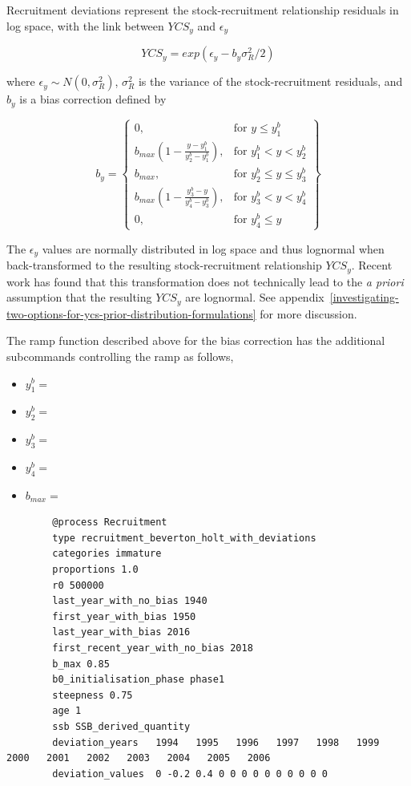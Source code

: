 Recruitment deviations represent the stock-recruitment relationship residuals in log space, with the link between $YCS_y$ and $\epsilon_y$

\begin{equation}\label{eq:recruit_devs}
	YCS_y = exp(\epsilon_y - b_y\sigma^2_R / 2)
\end{equation}

where $\epsilon_y\sim N(0,\sigma^2_R)$, $\sigma^2_R$ is the variance of the stock-recruitment residuals, and $b_y$ is a bias correction defined by \cite{methot2011adjusting}

\begin{equation}\label{eq::bias}
b_y = \left\{\begin{array}{lr}
0, & \text{for }y\leq y_1^b\\
b_{max}(1 - \frac{y - y_1^b}{y_2^b - y_1^b}), & \text{for } y_1^b < y < y_2^b\\
b_{max}, & \text{for } y_2^b\leq y \leq y_3^b\\
b_{max}(1 - \frac{y_3^b - y}{y_4^b - y_3^b}), & \text{for }  y_3^b< y < y_4^b\\
0, & \text{for } y_4^b\leq y
\end{array}\right\}
\end{equation}

The $\epsilon_y$ values are normally distributed in log space and thus lognormal when back-transformed to the resulting stock-recruitment relationship $YCS_y$. Recent work has found that this transformation does not technically lead to the \textit{a priori} assumption that the resulting $YCS_y$ are lognormal. See appendix~\ref{investigating-two-options-for-ycs-prior-distribution-formulations} for more discussion.

The ramp function described above for the bias correction has the additional subcommands controlling the ramp as follows,

\begin{itemize}
	\item $y_1^b = $ 
	\item $y_2^b = $ 
	\item $y_3^b = $ 
	\item $y_4^b = $ 
	\item $b_{max} = $ 
\end{itemize}

{\small{\begin{verbatim}
		@process Recruitment
		type recruitment_beverton_holt_with_deviations
		categories immature
		proportions 1.0
		r0 500000
		last_year_with_no_bias 1940
		first_year_with_bias 1950
		last_year_with_bias 2016
		first_recent_year_with_no_bias 2018
		b_max 0.85
		b0_initialisation_phase phase1
		steepness 0.75
		age 1
		ssb SSB_derived_quantity
		deviation_years   1994   1995   1996   1997   1998   1999   2000   2001   2002   2003   2004   2005   2006
		deviation_values  0 -0.2 0.4 0 0 0 0 0 0 0 0 0 0
\end{verbatim}}}


